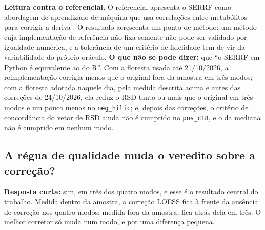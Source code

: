 
\textbf{Leitura contra o referencial.} O referencial apresenta o SERRF como abordagem de aprendizado de máquina que usa correlações entre metabólitos para corrigir a deriva \cite{fan2019systematic}. O resultado acrescenta um ponto de método: um método cuja implementação de referência não fixa semente não pode ser validado por igualdade numérica, e a tolerância de um critério de fidelidade tem de vir da variabilidade do próprio oráculo. \textbf{O que não se pode dizer:} que ``o SERRF em Python é equivalente ao do R''. Com a floresta usada até 21/10/2026, a reimplementação corrigia menos que o original fora da amostra em três modos; com a floresta adotada naquele dia, pela medida descrita acima e antes das correções de 24/10/2026, ela reduz o RSD tanto ou mais que o original em três modos e um pouco menos no \texttt{neg\_\allowbreak{}hilic}; e, depois das correções, o critério de concordância do vetor de RSD ainda não é cumprido no \texttt{pos\_\allowbreak{}c18}, e o da mediana não é cumprido em nenhum modo.

\subsection{A régua de qualidade muda o veredito sobre a correção?}\label{sec:5-3-2}

\textbf{Resposta curta:} sim, em três dos quatro modos, e esse é o resultado central do trabalho. Medida dentro da amostra, a correção LOESS fica à frente da ausência de correção nos quatro modos; medida fora da amostra, fica atrás dela em três. O melhor corretor só muda num modo, e por uma diferença pequena.

